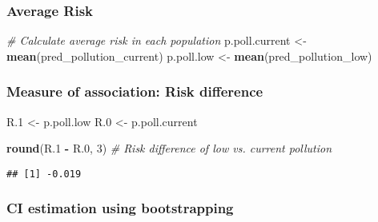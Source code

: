 \documentclass[
]{article}
\newenvironment{Shaded}{\begin{snugshade}}{\end{snugshade}}
\newcommand{\CommentTok}[1]{\textcolor[rgb]{0.56,0.35,0.01}{\textit{#1}}}
\newcommand{\DecValTok}[1]{\textcolor[rgb]{0.00,0.00,0.81}{#1}}
\newcommand{\FloatTok}[1]{\textcolor[rgb]{0.00,0.00,0.81}{#1}}
\newcommand{\FunctionTok}[1]{\textcolor[rgb]{0.13,0.29,0.53}{\textbf{#1}}}
\newcommand{\NormalTok}[1]{#1}
\newcommand{\OtherTok}[1]{\textcolor[rgb]{0.56,0.35,0.01}{#1}}
\newcommand{\SpecialCharTok}[1]{\textcolor[rgb]{0.81,0.36,0.00}{\textbf{#1}}}
\begin{document}
\subsubsection{Average Risk}\label{average-risk}

\begin{Shaded}
\begin{Highlighting}[]
\CommentTok{\# Calculate average risk in each population}
\NormalTok{p.poll.current }\OtherTok{\textless{}{-}} \FunctionTok{mean}\NormalTok{(pred\_pollution\_current)}
\NormalTok{p.poll.low }\OtherTok{\textless{}{-}} \FunctionTok{mean}\NormalTok{(pred\_pollution\_low)}
\end{Highlighting}
\end{Shaded}

\subsubsection{Measure of association: Risk
difference}\label{measure-of-association-risk-difference}

\begin{Shaded}
\begin{Highlighting}[]
\NormalTok{R}\FloatTok{.1} \OtherTok{\textless{}{-}}\NormalTok{ p.poll.low}
\NormalTok{R}\FloatTok{.0} \OtherTok{\textless{}{-}}\NormalTok{ p.poll.current}

\FunctionTok{round}\NormalTok{(R}\FloatTok{.1} \SpecialCharTok{{-}}\NormalTok{ R}\FloatTok{.0}\NormalTok{, }\DecValTok{3}\NormalTok{) }\CommentTok{\# Risk difference of low vs. current pollution}
\end{Highlighting}
\end{Shaded}

\begin{verbatim}
## [1] -0.019
\end{verbatim}

\subsubsection{CI estimation using
bootstrapping}\label{ci-estimation-using-bootstrapping}
\end{document}
